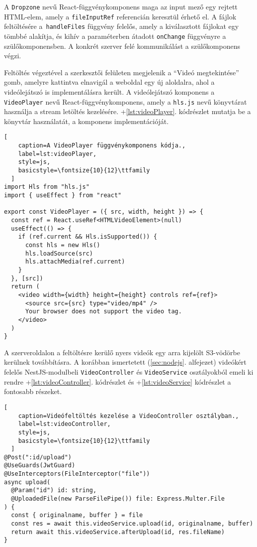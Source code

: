 A \verb|Dropzone| nevű React-függvénykomponens maga az input mező egy rejtett HTML-elem, amely a \verb|fileInputRef| referencián keresztül érhető el. A fájlok feltöltésére a~\verb|handleFiles| függvény felelős, amely a kiválasztott fájlokat egy tömbbé alakítja, és kihív a paraméterben átadott \verb|onChange| függvényre a szülőkomponensben. A konkrét szerver felé kommunikálást a szülőkomponens végzi.

Feltöltés végeztével a szerkesztői felületen megjelenik a ``Videó megtekintése'' gomb, amelyre kattintva elnavigál a weboldal egy új aloldalra, ahol a videólejátszó is implementálásra került. A videólejátszó komponens a \verb|VideoPlayer| nevű React-függvénykomponens, amely a \verb|hls.js| nevű könyvtárat használja a stream letöltés kezelésére. \Az+\ref{lst:videoPlayer}. kódrészlet mutatja be a könyvtár használatát, a komponens implementációját.

\begin{minipage}{0.92\textwidth}
  \begin{lstlisting}[
    caption=A VideoPlayer függvénykomponens kódja.,
    label=lst:videoPlayer,
    style=js,
    basicstyle=\fontsize{10}{12}\ttfamily
  ]
import Hls from "hls.js"
import { useEffect } from "react"

export const VideoPlayer = ({ src, width, height }) => {
  const ref = React.useRef<HTMLVideoElement>(null)
  useEffect(() => {
    if (ref.current && Hls.isSupported()) {
      const hls = new Hls()
      hls.loadSource(src)
      hls.attachMedia(ref.current)
    }
  }, [src])
  return (
    <video width={width} height={height} controls ref={ref}>
      <source src={src} type="video/mp4" />
      Your browser does not support the video tag.
    </video>
  )
}
\end{lstlisting}
\end{minipage}

A szerveroldalon a feltöltésre kerülő nyers videók egy arra kijelölt S3-vödörbe kerülnek továbbításra. A korábban ismertetett (\ref{sec:nodejs}. alfejezet) videókért felelős NestJS-modulbeli \verb|VideoController| és \verb|VideoService| osztályokból emeli ki rendre \az+\ref{lst:videoController}. kódrészlet és \az+\ref{lst:videoService} kódrészlet a fontosabb részeket.

\begin{minipage}{0.92\textwidth}
  \begin{lstlisting}[
    caption=Videófeltöltés kezelése a VideoController osztályban.,
    label=lst:videoController,
    style=js,
    basicstyle=\fontsize{10}{12}\ttfamily
  ]
@Post(":id/upload")
@UseGuards(JwtGuard)
@UseInterceptors(FileInterceptor("file"))
async upload(
  @Param("id") id: string,
  @UploadedFile(new ParseFilePipe()) file: Express.Multer.File
) {
  const { originalname, buffer } = file
  const res = await this.videoService.upload(id, originalname, buffer)
  return await this.videoService.afterUpload(id, res.fileName)
}
\end{lstlisting}
\end{minipage}

